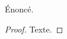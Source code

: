 \begin{theorem}
  Énoncé\footnotemark.
\end{theorem}
\vspace{-1em}
\begin{proof}
  Texte.
\end{proof}
\medskip
{} %
